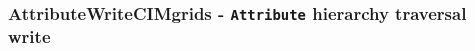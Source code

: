  
\setlength{\oldparskip}{\parskip}
\setlength{\parskip}{1.5ex}
\setlength{\oldparindent}{\parindent}
\setlength{\parindent}{0pt}
\setlength{\oldbaselineskip}{\baselineskip}
\setlength{\baselineskip}{11pt}
 
\def\bv{\begin{verbatim}}
\def\ev{\end{verbatim}}
\def\be{\begin{equation}}
\def\ee{\end{equation}}
\def\bea{\begin{eqnarray}}
\def\eea{\end{eqnarray}}
\def\bi{\begin{itemize}}
\def\ei{\end{itemize}}
\def\bn{\begin{enumerate}}
\def\en{\end{enumerate}}
\def\bd{\begin{description}}
\def\ed{\end{description}}
\def\({\left (}
\def\){\right )}
\def\[{\left [}
\def\]{\right ]}
\def\<{\left  \langle}
\def\>{\right \rangle}
\def\cI{{\cal I}}
\def\diag{\mathop{\rm diag}}
\def\tr{\mathop{\rm tr}}


 

  
 
\mbox{}\hrulefill\
 
\subsubsection [AttributeWriteCIMgrids] {AttributeWriteCIMgrids - {\tt Attribute} hierarchy traversal write}


